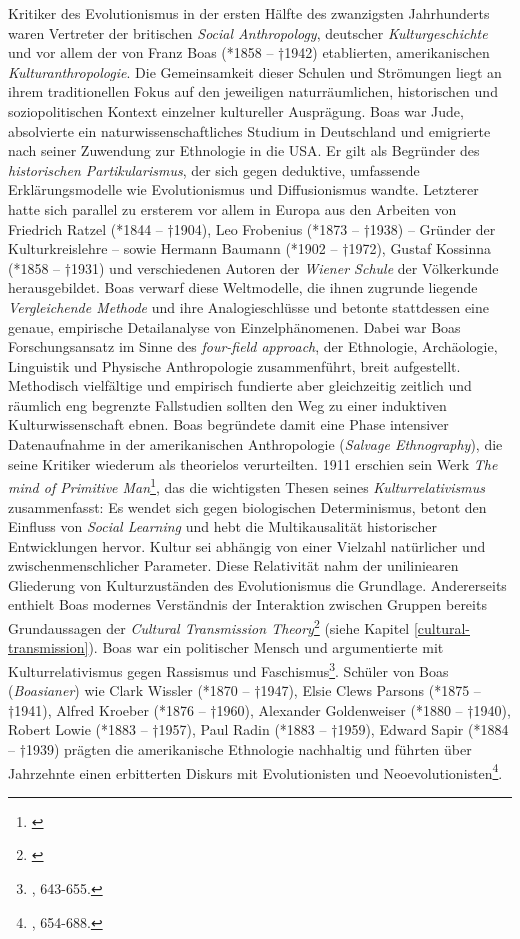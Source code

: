 \documentclass[openany,twoside,twocolumn]{book}
\let\rmarkdownfootnote\footnote%
\def\footnote{\protect\rmarkdownfootnote}
\begin{document}
Kritiker des Evolutionismus in der ersten Hälfte des zwanzigsten
Jahrhunderts waren Vertreter der britischen \emph{Social Anthropology},
deutscher \emph{Kulturgeschichte} und vor allem der von Franz Boas
(*1858 -- †1942) etablierten, amerikanischen \emph{Kulturanthropologie}.
Die Gemeinsamkeit dieser Schulen und Strömungen liegt an ihrem
traditionellen Fokus auf den jeweiligen naturräumlichen, historischen
und soziopolitischen Kontext einzelner kultureller Ausprägung. Boas war
Jude, absolvierte ein naturwissenschaftliches Studium in Deutschland und
emigrierte nach seiner Zuwendung zur Ethnologie in die USA. Er gilt als
Begründer des \emph{historischen Partikularismus}, der sich gegen
deduktive, umfassende Erklärungsmodelle wie Evolutionismus und
Diffusionismus wandte. Letzterer hatte sich parallel zu ersterem vor
allem in Europa aus den Arbeiten von Friedrich Ratzel (*1844 -- †1904),
Leo Frobenius (*1873 -- †1938) -- Gründer der Kulturkreislehre -- sowie
Hermann Baumann (*1902 -- †1972), Gustaf Kossinna (*1858 -- †1931) und
verschiedenen Autoren der \emph{Wiener Schule} der Völkerkunde
herausgebildet. Boas verwarf diese Weltmodelle, die ihnen zugrunde
liegende \emph{Vergleichende Methode} und ihre Analogieschlüsse und
betonte stattdessen eine genaue, empirische Detailanalyse von
Einzelphänomenen. Dabei war Boas Forschungsansatz im Sinne des
\emph{four-field approach}, der Ethnologie, Archäologie, Linguistik und
Physische Anthropologie zusammenführt, breit aufgestellt. Methodisch
vielfältige und empirisch fundierte aber gleichzeitig zeitlich und
räumlich eng begrenzte Fallstudien sollten den Weg zu einer induktiven
Kulturwissenschaft ebnen. Boas begründete damit eine Phase intensiver
Datenaufnahme in der amerikanischen Anthropologie (\emph{Salvage
Ethnography}), die seine Kritiker wiederum als theorielos verurteilten.
1911 erschien sein Werk \emph{The mind of Primitive Man}\footnote{\textcite{Boasmindprimitiveman1911}},
das die wichtigsten Thesen seines \emph{Kulturrelativismus}
zusammenfasst: Es wendet sich gegen biologischen Determinismus, betont
den Einfluss von \emph{Social Learning} und hebt die Multikausalität
historischer Entwicklungen hervor. Kultur sei abhängig von einer
Vielzahl natürlicher und zwischenmenschlicher Parameter. Diese
Relativität nahm der uniliniearen Gliederung von Kulturzuständen des
Evolutionismus die Grundlage. Andererseits enthielt Boas modernes
Verständnis der Interaktion zwischen Gruppen bereits Grundaussagen der
\emph{Cultural Transmission Theory}\footnote{\textcite{obrien_epistemological_2002}}
(siehe Kapitel \ref{cultural-transmission}). Boas war ein politischer
Mensch und argumentierte mit Kulturrelativismus gegen Rassismus und
Faschismus\footnote{\textcite{petermann_geschichte_2004}, 643-655.}.
Schüler von Boas (\emph{Boasianer}) wie Clark Wissler (*1870 -- †1947),
Elsie Clews Parsons (*1875 -- †1941), Alfred Kroeber (*1876 -- †1960),
Alexander Goldenweiser (*1880 -- †1940), Robert Lowie (*1883 -- †1957),
Paul Radin (*1883 -- †1959), Edward Sapir (*1884 -- †1939) prägten die
amerikanische Ethnologie nachhaltig und führten über Jahrzehnte einen
erbitterten Diskurs mit Evolutionisten und Neoevolutionisten\footnote{\textcite{petermann_geschichte_2004},
  654-688.}.
\end{document}
